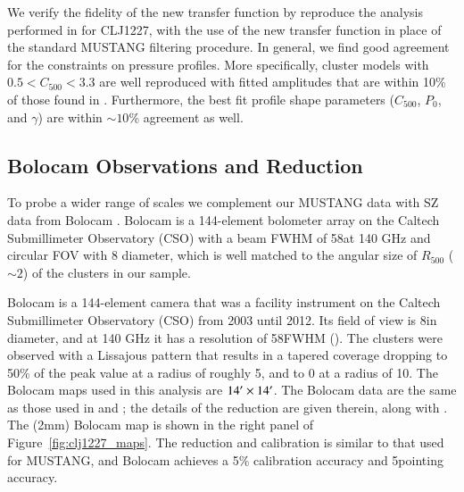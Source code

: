 \documentclass[twocolumn,traditabstract]{aa}
\begin{document}
We verify the fidelity of the new transfer function by reproduce the analysis performed in \citet{romero2016} for CLJ1227,
with the use of the new transfer function in place of the standard MUSTANG filtering procedure.
In general, we find good agreement for the constraints on pressure profiles. More specifically, cluster models with
$0.5 < C_{500} < 3.3$ are well reproduced with fitted amplitudes that are within 10\% of those found in \citet{romero2016}.
Furthermore, the best fit profile shape parameters ($C_{500}$, $P_0$, and $\gamma$) are within $\sim10$\% agreement as well.



\subsection{Bolocam Observations and Reduction}
\label{sec:bolocamobs}

To probe a wider range of scales we complement our MUSTANG data with SZ data from Bolocam \citep{glenn1998}. 
Bolocam is a 144-element bolometer
array on the Caltech Submillimeter Observatory (CSO) with a beam FWHM of 58\asecs at 140 GHz and circular FOV with 8\amins 
diameter, which is well matched to the angular size of $R_{500}$ ($\sim 2$\amin) of the clusters in our sample. 

Bolocam is a 144-element camera that was a facility instrument on the Caltech Submillimeter Observatory (CSO) from
2003 until 2012. Its field of view is 8\amins in diameter, and at 140 GHz it has a resolution of 58\asecs FWHM
(\citet{glenn1998,haig2004}). The clusters were observed with a Lissajous pattern that results in a tapered
coverage dropping to 50\% of the peak value at a radius of roughly 5\amin, and to 0 at a radius of 10\amin.
The Bolocam maps used in this analysis are $14\hbox{$^\prime$} \times 14\hbox{$^\prime$}$. The Bolocam data 
are the same as those used in \citet{czakon2015} and \citet{sayers2013}; the details of the reduction are 
given therein, along with \citet{sayers2011}. The (2mm) Bolocam map is shown in the right panel of Figure~\ref{fig:clj1227_maps}.
The reduction and calibration is similar to that used for MUSTANG, and Bolocam achieves a 
5\% calibration accuracy and 5\asecs pointing accuracy.
\end{document}
